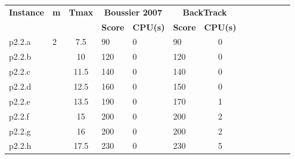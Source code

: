 \begin{table}[H]
\begin{tabularx}{\textwidth}{lXcXlXcXcXcXc}
\hline
\multicolumn{1}{c}{\multirow{2}{*}{\textbf{Instance}}} & \multirow{2}{*}{\textbf{m}} & \multicolumn{1}{c}{\multirow{2}{*}{\textbf{Tmax}}} & \multicolumn{2}{c}{\textbf{Boussier 2007}} & \multicolumn{2}{c}{\textbf{BackTrack}} \\ \cline{4-7} 
\multicolumn{1}{c}{}                                   &                             & \multicolumn{1}{c}{}                               & \textbf{Score}      & \textbf{CPU(s)}      & \textbf{Score}    & \textbf{CPU(s)}    \\ \hline
p2.2.a                                                 & 2                           & 7.5                                                & 90                  & 0                    & 90                & 0                  \\
p2.2.b                                                 &                             & 10                                                 & 120                 & 0                    & 120               & 0                  \\
p2.2.c                                                 &                             & 11.5                                               & 140                 & 0                    & 140               & 0                  \\
p2.2.d                                                 &                             & 12.5                                               & 160                 & 0                    & 150               & 0                  \\
p2.2.e                                                 &                             & 13.5                                               & 190                 & 0                    & 170               & 1                  \\
p2.2.f                                                 &                             & 15                                                 & 200                 & 0                    & 200               & 2                  \\
p2.2.g                                                 &                             & 16                                                 & 200                 & 0                    & 200               & 2                  \\
p2.2.h                                                 &                             & 17.5                                               & 230                 & 0                    & 230               & 5                  \\

\end{tabularx}
\end{table}
